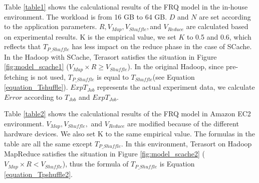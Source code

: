 {Table \ref{table1} shows the calculational results of the FRQ model in the in-house environment. The workload is from 16 GB to 64 GB. 
\(D\) and \(N\) are set according to the application parameters. \(R, V_{Map}, V_{Shuffle},\)and \(V_{Reduce}\) are calculated based on experimental results. K is the empirical value, we set \(K\) to 0.5 and 0.6, which reflects that \(T_{P\_Shuffle}\) has less impact on the reduce phase in the case of SCache. 
In the Hadoop with SCache, Terasort satisfies the situation in Figure \ref{fig:model_scache1} (\(V_{Map} \times R \ge V_{Shuffle}\)). 
In the original Hadoop, since pre-fetching is not used, \(T_{P\_Shuffle}\) is equal to \(T_{Shuffle}\)(see Equation \ref{equation_Tshuffle}). \(ExpT_{Job}\) represents the actual experiment data, we calculate \(Error\) according to \(T_{Job}\) and \(ExpT_{Job}\). 

Table \ref{table2} shows the calculational results of the FRQ model in Amazon EC2 environment. \;\(V_{Map}, V_{Shuffle},\) and \(V_{Reduce}\) are modified because of the different hardware devices. We also set K to the same empirical value. The formulas in the table are all the same except \(T_{P\_Shuffle}\). In this environment, Terasort on Hadoop MapReduce satisfies the situation in Figure \ref{fig:model_scache2} (\(V_{Map} \times R < V_{Shuffle}\)), thus the formula of \(T_{P\_Shuffle}\) is Equation \ref{equation_Tpshuffle2}. 

}

